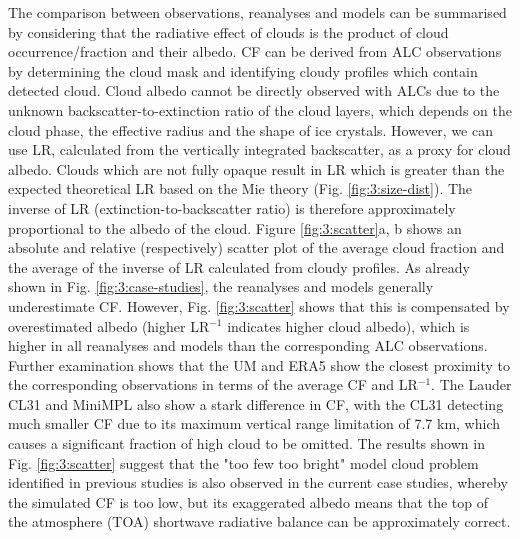 The comparison between observations, reanalyses and models can be summarised
by considering that the radiative effect of clouds is the product of
cloud occurrence/fraction and their albedo. CF can be derived
from ALC observations by determining the cloud mask and identifying cloudy
profiles which contain detected cloud. Cloud albedo cannot be
directly observed with ALCs due to the unknown backscatter-to-extinction ratio of
the cloud layers, which depends on the cloud phase, the effective radius
and the shape of ice crystals. However, we can use LR, calculated from
the vertically integrated backscatter, as a proxy for cloud albedo. Clouds which
are not fully opaque result in LR which is greater than the expected theoretical
LR based on the Mie theory (Fig. \ref{fig:3:size-dist}). The inverse of LR (extinction-to-backscatter ratio)
is therefore approximately proportional to the albedo of the cloud.
Figure \ref{fig:3:scatter}a, b shows an absolute and relative (respectively) scatter plot of the average cloud fraction
and the average of the inverse of LR calculated from cloudy profiles.
As already shown in Fig. \ref{fig:3:case-studies}, the reanalyses and models generally underestimate
CF. However, Fig. \ref{fig:3:scatter} shows that this is compensated by overestimated albedo (higher LR$^{-1}$
indicates higher cloud albedo), which is higher in all reanalyses and models
than the corresponding ALC observations. Further examination shows that the UM and ERA5 show the closest
proximity to the corresponding observations in terms of the average CF and LR$^{-1}$. The Lauder CL31 and MiniMPL
also show a stark difference in CF, with the CL31 detecting much smaller CF due
to its maximum vertical range limitation of 7.7 km, which causes a significant
fraction of high cloud to be omitted. The results shown in Fig. \ref{fig:3:scatter}
suggest that the "too few too bright" model cloud problem identified in
previous studies \citep{nam2012,klein2013,wall2017,kuma2020a} is also observed in the current case studies, whereby the
simulated CF is too low, but its exaggerated albedo means that
the top of the atmosphere (TOA) shortwave radiative balance can be approximately
correct.

